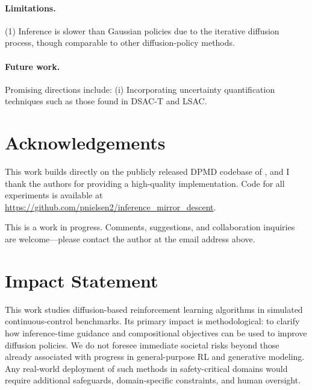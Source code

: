 \documentclass{article}
\theoremstyle{plain}
\theoremstyle{definition}
\theoremstyle{remark}
\begin{document}
\paragraph{Limitations.}
(1) Inference is slower than Gaussian policies due to the iterative diffusion process, though comparable to other diffusion-policy methods.

\paragraph{Future work.}
Promising directions include:
(i) Incorporating uncertainty quantification techniques such as those found in DSAC-T and LSAC.


\section*{Acknowledgements}

This work builds directly on the publicly released DPMD codebase of \citet{ma2025soft}, and I thank the authors for providing a high-quality implementation.
Code for all experiments is available at \url{https://github.com/pnielsen2/inference_mirror_descent}.

This is a work in progress.
Comments, suggestions, and collaboration inquiries are welcome---please contact the author at the email address above.

\section*{Impact Statement}

This work studies diffusion-based reinforcement learning algorithms in simulated continuous-control benchmarks.
Its primary impact is methodological: to clarify how inference-time guidance and compositional objectives can be used to improve diffusion policies.
We do not foresee immediate societal risks beyond those already associated with progress in general-purpose RL and generative modeling.
Any real-world deployment of such methods in safety-critical domains would require additional safeguards, domain-specific constraints, and human oversight.



\end{document}
